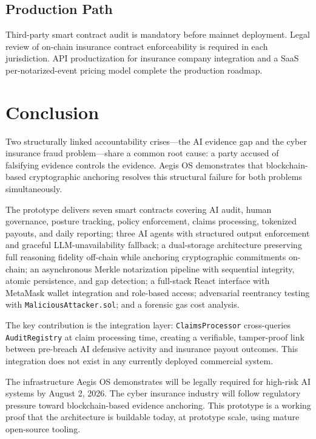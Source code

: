 \documentclass[12pt,a4paper]{article}
\begin{document}
\subsection{Production Path}
Third-party smart contract audit is mandatory before mainnet deployment.
Legal review of on-chain insurance contract enforceability is required
in each jurisdiction. API productization for insurance company
integration and a SaaS per-notarized-event pricing model complete
the production roadmap.

\section{Conclusion}
\label{sec:conclusion}

Two structurally linked accountability crises---the AI evidence gap
and the cyber insurance fraud problem---share a common root cause:
a party accused of falsifying evidence controls the evidence. Aegis OS
demonstrates that blockchain-based cryptographic anchoring resolves
this structural failure for both problems simultaneously.

The prototype delivers seven smart contracts covering AI audit,
human governance, posture tracking, policy enforcement, claims
processing, tokenized payouts, and daily reporting; three AI agents
with structured output enforcement and graceful LLM-unavailability
fallback; a dual-storage architecture preserving full reasoning
fidelity off-chain while anchoring cryptographic commitments on-chain;
an asynchronous Merkle notarization pipeline with sequential integrity,
atomic persistence, and gap detection; a full-stack React interface
with MetaMask wallet integration and role-based access; adversarial
reentrancy testing with \texttt{MaliciousAttacker.sol}; and a forensic
gas cost analysis.

The key contribution is the integration layer: \texttt{ClaimsProcessor}
cross-queries \texttt{AuditRegistry} at claim processing time,
creating a verifiable, tamper-proof link between pre-breach AI
defensive activity and insurance payout outcomes. This integration
does not exist in any currently deployed commercial system.

The infrastructure Aegis OS demonstrates will be legally required for
high-risk AI systems by August 2, 2026. The cyber insurance industry
will follow regulatory pressure toward blockchain-based evidence
anchoring. This prototype is a working proof that the architecture is
buildable today, at prototype scale, using mature open-source tooling.
\end{document}
